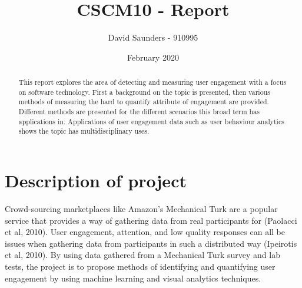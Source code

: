 \documentclass[12pt]{article}
\title{CSCM10 - Report}
\author{David Saunders - 910995}
\date{February 2020}
\renewcommand{\_}{\kern-1.5pt\textunderscore\kern-1.5pt}
\begin{document}
\maketitle

\begin{abstract}
This report explores the area of detecting and measuring user engagement with a focus on software technology. First a background on the topic is presented, then various methods of measuring the hard to quantify attribute of engagement are provided. Different methods are presented for the different scenarios this broad term has applications in. Applications of user engagement data such as user behaviour analytics shows the topic has multidisciplinary uses.\par
\end{abstract}

\vspace{\baselineskip}



\tableofcontents

\section*{Description of project}
Crowd-sourcing marketplaces like Amazon's Mechanical Turk are a popular service that provides a way of gathering data from real participants for (Paolacci et al, 2010). User engagement, attention, and low quality responses can all be issues when gathering data from participants in such a distributed way (Ipeirotis et al, 2010). By using data gathered from a Mechanical Turk survey and lab tests, the project is to propose methods of identifying and quantifying user engagement by using machine learning and visual analytics techniques. \par
\end{document}
